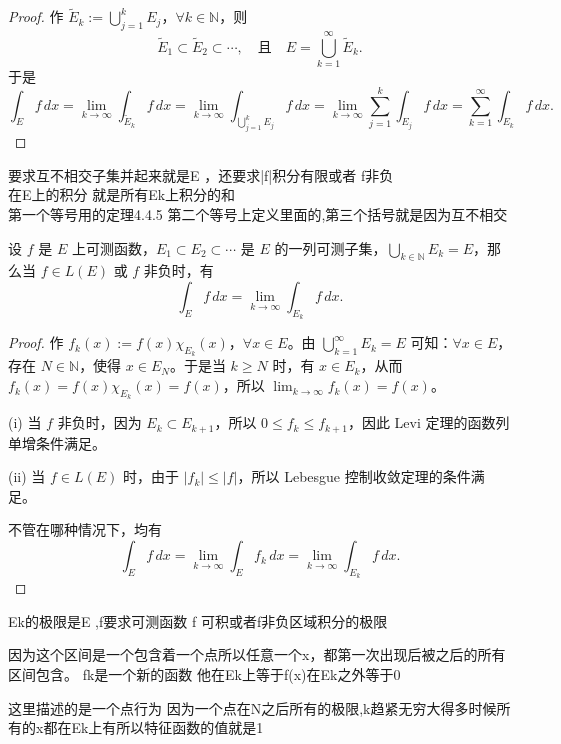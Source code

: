 \documentclass[lang=cn,10pt]{elegantbook}
\begin{document}
\begin{proof}
作 $\tilde{E}_k := \bigcup_{j=1}^k E_j$，$\forall k \in \mathbb{N}$，则
\[
\tilde{E}_1 \subset \tilde{E}_2 \subset \cdots, \quad \text{且} \quad E = \bigcup_{k=1}^\infty \tilde{E}_k.
\]
于是
\[
\int_E f\,dx 
= \lim_{k \to \infty} \int_{\tilde{E}_k} f\,dx
= \lim_{k \to \infty} \int_{\bigcup_{j=1}^k E_j} f\,dx
= \lim_{k \to \infty} \sum_{j=1}^k \int_{E_j} f\,dx
= \sum_{k=1}^\infty \int_{E_k} f\,dx.
\]
\end{proof}
要求互不相交子集并起来就是E  ，还要求|f|积分有限或者 f非负\\

在E上的积分 就是所有Ek上积分的和 \\

第一个等号用的定理4.4.5 第二个等号上定义里面的,第三个括号就是因为互不相交\\
\begin{theorem}[积分区域极限定理]
设 $f$ 是 $E$ 上可测函数，$E_1 \subset E_2 \subset \cdots$ 是 $E$ 的一列可测子集，$\bigcup_{k \in \mathbb{N}} E_k = E$，那么当 $f \in L(E)$ 或 $f$ 非负时，有
\[
\int_E f\, dx = \lim_{k \to \infty} \int_{E_k} f\, dx.
\]
\end{theorem}

\begin{proof}
作 $f_k(x) := f(x) \chi_{E_k}(x)$，$\forall x \in E$。由 $\bigcup_{k=1}^\infty E_k = E$ 可知：$\forall x \in E$，存在 $N \in \mathbb{N}$，使得 $x \in E_N$。于是当 $k \ge N$ 时，有 $x \in E_k$，从而 $f_k(x) = f(x) \chi_{E_k}(x) = f(x)$，所以 $\lim_{k \to \infty} f_k(x) = f(x)$。

\noindent (i) 当 $f$ 非负时，因为 $E_k \subset E_{k+1}$，所以 $0 \le f_k \le f_{k+1}$，因此 Levi 定理的函数列单增条件满足。

\noindent (ii) 当 $f \in L(E)$ 时，由于 $|f_k| \le |f|$，所以 Lebesgue 控制收敛定理的条件满足。

不管在哪种情况下，均有
\[
\int_E f\, dx = \lim_{k \to \infty} \int_E f_k\, dx = \lim_{k \to \infty} \int_{E_k} f\, dx.
\]
\end{proof}
Ek的极限是E ,f要求可测函数 f 可积或者f非负区域积分的极限 

因为这个区间是一个包含着一个点所以任意一个x，都第一次出现后被之后的所有区间包含。
fk是一个新的函数 他在Ek上等于f(x)在Ek之外等于0

这里描述的是一个点行为 因为一个点在N之后所有的极限,k趋紧无穷大得多时候所有的x都在Ek上有所以特征函数的值就是1
\end{document}
